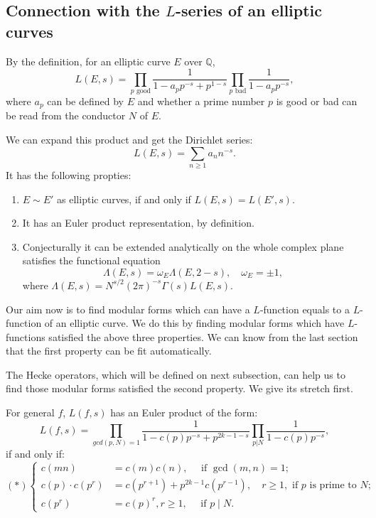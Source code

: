     \subsection{Connection with the $L$-series of an elliptic curves}

    By the definition, for  an elliptic curve $E$ over $\mathbb{Q}$,
    $$L(E,s)=\prod_{\text{$p$ good}}\frac{1}{1-a_pp^{-s}+p^{1-s}}\prod_{\text{$p$ bad} }\frac{1}{1-a_pp^{-s}},$$
    where $a_p$ can be defined  by $E$ and whether a prime number $p$ is good or bad can be read from the conductor $N$ of $E$.
    
    We can expand this product and get the Dirichlet series:
    $$L(E , s)=\sum_{n \geq 1}  a_nn^{-s}.$$
    It has the following propties:
    \begin{enumerate}
        \item $E \sim E'$ as elliptic curves, if and only if $L(E,s)=L(E',s)$.
        \item It has an Euler product representation, by definition.
        \item Conjecturally it can be extended analytically on the whole complex plane satisfies the functional equation 
         $$\Lambda(E,s)=\omega_E\Lambda(E,2-s),\quad\omega_E=\pm 1,$$
         where $\Lambda(E,s)=N^{s/2}(2\pi)^{-s}\Gamma(s)L(E,s)$.
    \end{enumerate}

    Our aim now is to find modular forms which  can have a $L$-function equals to a $L$-function of an  elliptic curve. We do this by finding modular forms which have $L$-functions satisfied the above three properties.  We can know from the last section that the first property can be fit automatically.

    The Hecke operators,  which will be defined on next subsection, can help us to find those modular forms satisfied the second property. We give its stretch first.

    \begin{property}
        For general $f$, $L(f,s)$ has an Euler product of the form:
        $$L(f,s)=\prod_{gcd(p,N)=1}\frac{1}{1-c(p)p^{-s}+p^{2k-1-s}}\prod_{p\vert N }\frac{1}{1-c(p)p^{-s}},$$
        if and only if:
        $$(*)
        \left\{\begin{aligned}
            c(m n) & =c(m) c(n), \quad \text { if } \operatorname{gcd}(m, n)=1 ; \\
            c(p) \cdot c\left(p^{r}\right) & =c\left(p^{r+1}\right)+p^{2 k-1} c\left(p^{r-1}\right),\quad r \geq 1, \text { if } p \text { is prime to } N \text {; } \\
            c\left(p^{r}\right) & =c(p)^{r}, r \geq 1, \quad \text { if } p \mid N .
        \end{aligned}\right.
        $$
    \end{property}
    
